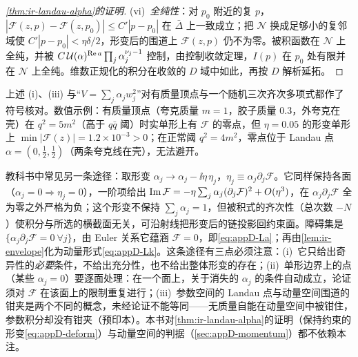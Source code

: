 \begin{proof}[\cref{thm:ir-landau-alpha}的证明]
(vi)~\emph{全纯性}：对 $p_0$ 附近的复 $p$，$|\mathcal F(z,p)-\mathcal F(z,p_0)|\le C'|p-p_0|$ 在 $\bar\Delta$ 上一致成立；把 $\mathcal N$ 换成足够小的复邻域使 $C'|p-p_0|<\eta\delta/2$，形变后的围道上 $\mathcal F(z,p)$ 仍不为零。被积函数在 $\mathcal N$ 上全纯，并被 $C\,\mathcal U(\alpha)^{\operatorname{Re} a}\prod_j\alpha_j^{\nu_j-1}$ 控制，由控制收敛定理，$I(p)$ 在 $p_0$ 处有限并在 $\mathcal N$ 上全纯。维数正规化的积分在收敛的 $D$ 域中如此，再按 $D$ 解析延拓。
\end{proof}

上述 (i)、(iii) 与“$V=\sum_j\alpha_jw_j^2$”对有质量顶点与一个随机三次齐次多项式都作了符号核对。数值示例：有质量顶点（夸克质量 $m=1$，胶子质量 $0.3$，外夸克在壳）在 $q^2=5m^2$（高于 $q\bar q$ 阈）时实单形上有 $\mathcal F$ 的零点，但 $\eta=0.05$ 的形变单形上 $\min|\mathcal F(z)|=1.2\times10^{-3}>0$；在正常阈 $q^2=4m^2$，零点位于 Landau 点 $\alpha=(0,\frac12,\frac12)$（两条夸克线在壳），无法避开。

\begin{remark}\label{rem:appD-parameter-proof}
教科书中常见另一条途径：取形变 $\alpha_j\to\alpha_j-\ii\eta\,\eta_j$，$\eta_j\equiv\alpha_j\partial_j\mathcal F$。它同样保持各面（$\alpha_j=0\Rightarrow\eta_j=0$），一阶项给出 $\operatorname{Im}\mathcal F=-\eta\sum_j\alpha_j(\partial_j\mathcal F)^2+O(\eta^3)$，在 $\alpha_j\partial_j\mathcal F$ 全为零之外严格为负；这个形变不保持 $\sum_j\alpha_j=1$，但被积式的齐次性（总次数 $-N$）使积分与所选的横截面无关，可沿射线把形变后的链投影回约束面。障碍集是 $\{\alpha_j\partial_j\mathcal F=0\ \forall j\}$，由 Euler 关系它蕴涵 $\mathcal F=0$，即\cref{eq:appD-La}；再由\cref{lem:ir-envelope}化为动量形式\cref{eq:appD-Lk}。这条途径有三点必须注意：(i)~它只给出奇异性的\emph{必要}条件，不给出充分性，也不给出整体形变的存在；(ii)~单形边界上的点（某些 $\alpha_j=0$）要逐面处理：在一个面上，关于消失的 $\alpha_j$ 的条件自动成立，论证须对 $\mathcal F$ 在该面上的限制重复进行；(iii)~参数空间的 Landau 点与动量空间围道的钳夹是两个不同的概念，未经论证不能等同——无质量自能在动量空间中被钳住，参数积分却没有钳夹\cite[附录~D.1]{Collins:2020euz}（预印本）。本书对\cref{thm:ir-landau-alpha}的证明（保持约束的形变\cref{eq:appD-deform}）与动量空间的判据（\cref{sec:appD-momentum}）都不依赖本注。
\end{remark}

